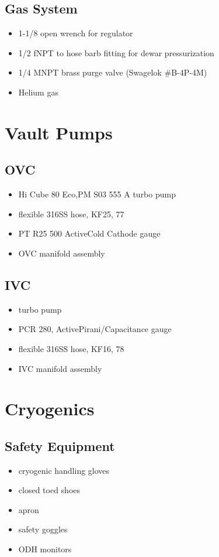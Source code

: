   \subsection{Gas System}
\begin{itemize}
 \item 1-1/8\inches{} open wrench for regulator
 \item 1/2\inches{} fNPT to hose barb fitting for dewar pressurization
 \item 1/4\inches{} MNPT brass purge valve (Swagelok \#B-4P-4M)
 \item Helium gas
\end{itemize}


  
\section{Vault Pumps}
  \subsection{OVC}
\begin{itemize}
 \item {} Hi Cube 80 Eco,PM S03 555 A turbo pump
\item {} flexible 316SS hose, KF25, 77\inches
\item {} PT R25 500 ActiveCold Cathode gauge
\item OVC manifold assembly
\end{itemize}

  \subsection{IVC}
\begin{itemize}
 \item turbo pump
\item {} PCR 280, ActivePirani/Capacitance gauge
\item {} flexible 316SS hose, KF16, 78\inches
\item IVC manifold assembly
\end{itemize}


\section{Cryogenics}
  \subsection{Safety Equipment}
\begin{itemize}
 \item cryogenic handling gloves
\item closed toed shoes
\item apron
\item safety goggles
\item ODH monitors
\end{itemize}

